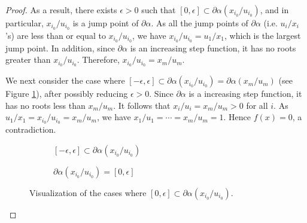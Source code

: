 \documentclass[12pt]{article}
\theoremstyle{definition}
\theoremstyle{plain}
\begin{document}
\begin{proof}
As a result, there exists $\epsilon>0$ such that $[0,\epsilon] \subset \partial \alpha (x_{i_0}/u_{i_0})$, and in particular, $x_{i_0}/u_{i_0}$ is a jump point of $\partial \alpha$. As all the jump points of $\partial \alpha$ (i.e. $u_i/x_i$'s) are less than or equal to $x_{i_0}/u_{i_0}$, we have $x_{i_0}/u_{i_0} = u_1/x_1$, which is the largest jump point. In addition, since $\partial \alpha$ is an increasing step function, it has no roots greater than $x_{i_0}/u_{i_0}$. Therefore, $x_{i_0}/u_{i_0} = x_{m}/u_{m}$.

We next consider the case where $[-\epsilon,\epsilon] \subset \partial \alpha (x_{i_0}/u_{i_0}) = \partial \alpha (x_{m}/u_{m})$ (see Figure \ref{proof_c}), after possibly reducing $\epsilon>0$. Since $\partial \alpha$ is a increasing step function, it has no roots less than $x_{m}/u_{m}$. It follows that $x_i/u_i = x_{m}/u_{m}>0$ for all $i$. As $u_1/x_1 = x_{i_0}/u_{i_0} = x_m/u_m$, we have $x_1/u_1 = \cdots = x_m/u_m = 1$. Hence $f(x) = 0$, a contradiction.
\begin{figure}[ht!]
\centering
\begin{subfigure}{.49\textwidth}
  \centering
  \caption{$[-\epsilon,\epsilon]\subset \partial \alpha(x_{i_0}/u_{i_0})$}
  \label{proof_c}
\end{subfigure}
\begin{subfigure}{.49\textwidth}
  \centering
  \caption{$\partial \alpha(x_{i_0}/u_{i_0})= [0,\epsilon]$}
  \label{proof_d}
\end{subfigure}
\caption{Visualization of the cases where $[0,\epsilon] \subset \partial \alpha(x_{i_0}/u_{i_0})$.}
\vspace*{-3mm}

\end{figure}
\end{proof}
\end{document}

